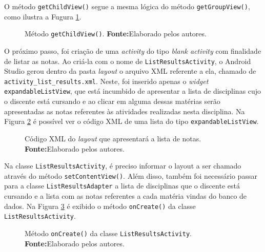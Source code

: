 	\pagebreak

	\par O método \texttt{getChildView()} segue a mesma lógica do método
\texttt{getGroupView()}, como ilustra a Fugura \ref{fig:app14}.

	\begin{figure}[h!] 
		
		\caption[Método getChildView()]{Método \texttt{getChildView()}.
		\textbf{Fonte:}Elaborado pelos autores.}
		\label{fig:app14}
	\end{figure}
	
	\par O próximo passo, foi criação de uma \textit{activity} do tipo
\textit{blank activity} com finalidade de listar as notas. Ao criá-la com o
nome de \texttt{ListResultsActivity}, o Android Studio gerou dentro da pasta
\textit{layout} o arquivo XML referente a ela, chamado de
\texttt{activity\_list\_results.xml}. Neste, foi inserido apenas o
\textit{widget} \texttt{expandableListView}, que está incumbido de apresentar
a lista de disciplinas cujo o discente está cursando e ao clicar em alguma
dessas matérias serão apresentadas as notas referentes às atividades
realizadas nesta disciplina. Na Figura \ref{fig:app15} é possível ver o código XML de uma
lista do tipo \texttt{expandableListView}.

	\begin{figure}[h!] 
		
		\caption[Código XML do layout que apresentará a lista de notas]{Código XML do
		\textit{layout} que apresentará a lista de notas.
		\textbf{Fonte:}Elaborado pelos autores.}
		\label{fig:app15}
	\end{figure}
	
	\pagebreak
	
	\par Na classe \texttt{ListResultsActivity}, é preciso informar o layout a ser
chamado através do método \texttt{setContentView()}. Além disso, também foi
necessário passar para a classe \texttt{ListResultsAdapter} a lista de
disciplinas que o discente está cursando e a lista com as notas referentes a
cada matéria vindas do banco de dados. Na Figura \ref{fig:app16} é exibido o
método \texttt{onCreate()} da classe \texttt{ListResultsActivity}. 
	
	
	\begin{figure}[h!] 
		
		\caption[ Método onCreate() da classe ListResultsActivity]{ Método
		\texttt{onCreate()} da classe \texttt{ListResultsActivity}.
		\textbf{Fonte:}Elaborado pelos autores.}
		\label{fig:app16}
	\end{figure}

